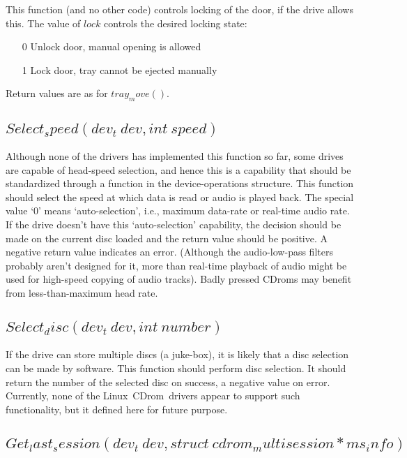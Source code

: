 \documentclass{article}
\def\linux{{\sc Linux}}
\def\cdrom{{\sc CDrom}}
\begin{document}
This function (and no other code) controls locking of the door, if the
drive allows this. The value of $lock$ controls the desired locking
state:
\begin{itemize}
\item[0] Unlock door, manual opening is allowed
\item[1] Lock door, tray cannot be ejected manually
\end{itemize}
Return values are as for $tray_move()$.

\subsection{$Select_speed(dev_t\ dev, int\ speed)$}

Although none of the drivers has implemented this function so far,
some drives are capable of head-speed selection, and hence this is a
capability that should be standardized through a function in the
device-operations structure. This function should select the speed at
which data is read or audio is played back. The special value `0'
means `auto-selection', i.e., maximum data-rate or real-time audio
rate. If the drive doesn't have this `auto-selection' capability, the
decision should be made on the current disc loaded and the return
value should be positive. A negative return value indicates an
error. (Although the audio-low-pass filters probably aren't designed
for it, more than real-time playback of audio might be used for
high-speed copying of audio tracks). Badly pressed \cdrom s may
benefit from less-than-maximum head rate.

\subsection{$Select_disc(dev_t\ dev, int\ number)$}

If the drive can store multiple discs (a juke-box), it is likely that
a disc selection can be made by software. This function should perform
disc selection. It should return the number of the selected disc on
success, a negative value on error. Currently, none of the \linux\ 
\cdrom\ drivers appear to support such functionality, but it defined
here for future purpose.

\subsection{$Get_last_session(dev_t\ dev, struct\ cdrom_multisession *
ms_info)$}
\end{document}
